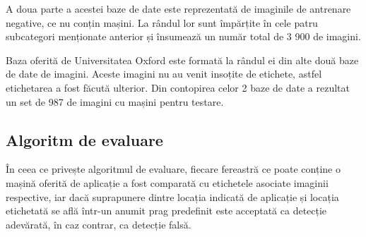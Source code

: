 A doua parte a acestei baze de date este reprezentată de imaginile de antrenare negative, ce nu conțin mașini. La rândul lor sunt împărțite în cele patru subcategori menționate anterior și însumează un număr total de 3 900 de imagini.

Baza oferită de Universitatea Oxford este formată la rândul ei din alte două baze de date de imagini. Aceste imagini nu au venit insoțite de etichete, astfel etichetarea a fost făcută ulterior. Din contopirea celor 2 baze de date a rezultat un set de 987 de imagini cu mașini pentru testare.

\subsection*{Algoritm de evaluare}

În ceea ce privește algoritmul de evaluare, fiecare fereastră ce poate conține o mașină oferită de aplicație a fost comparată cu etichetele asociate imaginii respective, iar dacă suprapunere dintre locația indicată de aplicație și locația etichetată se află într-un anumit prag predefinit este acceptată ca detecție adevărată, în caz contrar, ca detecție falsă.